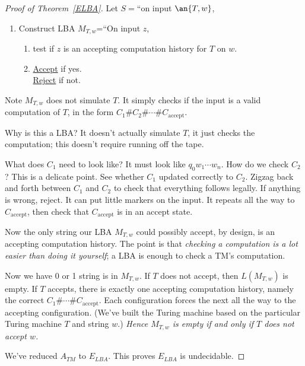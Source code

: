 \begin{proof}[Proof of Theorem~\ref{ELBA}]
Let $S=$``on input $\an{T,w}$,
\begin{enumerate}
\item
Construct LBA $M_{T,w}$=``On input $z$,
\begin{enumerate}
\item
test if $z$ is an accepting computation history for $T$ on $w$. 
\item
\ul{Accept} if yes.\\
\ul{Reject}  if not.
\end{enumerate}
\end{enumerate}
Note $M_{T,w}$ does not simulate $T$. It simply checks if the input is a valid computation of $T$, in the form $C_1\#C_2\#\cdots \#C_{\text{accept}}$. %


Why is this a LBA? It doesn't actually simulate $T$, it just checks the computation; this doesn't require running off the tape.

What does $C_1$ need to look like? It must look like $q_0w_1\cdots w_n$. How do we check $C_2$? This is a delicate point. %
See whether $C_1$ updated correctly to $C_2$. Zigzag back and forth between $C_1$ and $C_2$ to check that everything follows legally. If anything is wrong, reject. 
It can put little markers on the input.
It repeats all the way to $C_{\text{accept}}$, then check that $C_{\text{accept}}$ is in an accept state.


Now the only string our LBA $M_{T,w}$ could possibly accept, by design, is an accepting computation history. The point is that {\it checking a computation is a lot easier than doing it yourself}; a LBA is enough to check a TM's computation.

Now we have 0 or 1 string is in $M_{T,w}$. If $T$ does not accept, then $L(M_{T,w})$ is empty. If $T$ accepts, there is exactly one accepting computation history, namely the correct $C_1\#\cdots \# C_{\text{accept}}$. %
Each configuration forces the next all the way to the accepting configuration. (We've built the Turing machine based on the particular Turing machine $T$ and string $w$.)
\emph{Hence $M_{T,w}$ is empty if and only if $T$ does not accept $w$.}

%
We've reduced $A_{TM}$ to $E_{LBA}$.  
This proves $E_{LBA}$ is undecidable. %
\end{proof}

